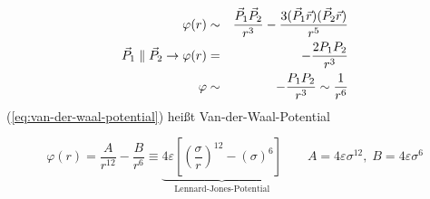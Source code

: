 

\begin{eqnarray}
\varphi(r) & \sim & \dfrac{\vec{P}_1\vec{P}_2}{r^3}-\dfrac{3(\vec{P}_1\vec{r})(\vec{P}_2\vec{r})}{r^5} \notag \\
\vec{P}_1 \parallel \vec{P}_2 \to \varphi(r) & = & -\dfrac{2P_1 P_2}{r^3} \notag \\
\varphi & \sim & -\dfrac{P_1 P_2}{r^3} \sim \dfrac{1}{r^6}\label{eq:van-der-waal-potential}
\end{eqnarray}
(\ref{eq:van-der-waal-potential}) heißt Van-der-Waal-Potential

$$\varphi(r)=\dfrac{A}{r^{12}}-\dfrac{B}{r^6}\equiv \underbrace{4\varepsilon\left[\left(\dfrac{\sigma}{r}\right)^{12}-\left(\sigma\right)^6\right]}_{\text{Lennard-Jones-Potential}} \qquad A=4\varepsilon \sigma^{12},\;B=4\varepsilon \sigma^6$$